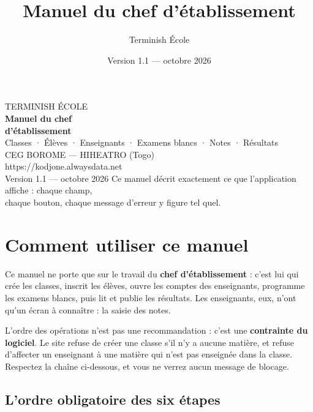 \documentclass[11pt,a4paper]{article}
\title{Manuel du chef d'établissement}
\author{Terminish École}
\date{Version 1.1 — octobre 2026}
\begin{document}
\begin{titlepage}
\pagecolor{vert}
\color{white}
\vspace*{3.2cm}
{\small\color{vertclair}TERMINISH ÉCOLE}\\[2mm]
{\Huge\bfseries Manuel du chef\\[1mm] d'établissement}\\[6mm]
{\large\color{vertclair}Classes · Élèves · Enseignants · Examens blancs · Notes · Résultats}\\[3cm]
{\large CEG BOROME — HIHEATRO (Togo)}\\[2mm]
{\large https://kodjone.alwaysdata.net}\\[2mm]
{\color{vertclair}Version 1.1 — octobre 2026}
\vfill
{\small\color{vertclair}Ce manuel décrit exactement ce que l'application affiche : chaque champ,\\
chaque bouton, chaque message d'erreur y figure tel quel.}
\end{titlepage}
\pagecolor{white}
\color{encre}

\tableofcontents
\newpage

\section{Comment utiliser ce manuel}

Ce manuel ne porte que sur le travail du \textbf{chef d'établissement} : c'est lui
qui crée les classes, inscrit les élèves, ouvre les comptes des enseignants,
programme les examens blancs, puis lit et publie les résultats. Les enseignants,
eux, n'ont qu'un écran à connaître : la saisie des notes.

\begin{boiteastuce}
L'ordre des opérations n'est pas une recommandation : c'est une
\textbf{contrainte du logiciel}. Le site refuse de créer une classe s'il n'y a
aucune matière, et refuse d'affecter un enseignant à une matière qui n'est pas
enseignée dans la classe. Respectez la chaîne ci-dessous, et vous ne verrez
aucun message de blocage.
\end{boiteastuce}

\subsection{L'ordre obligatoire des six étapes}
\end{document}
